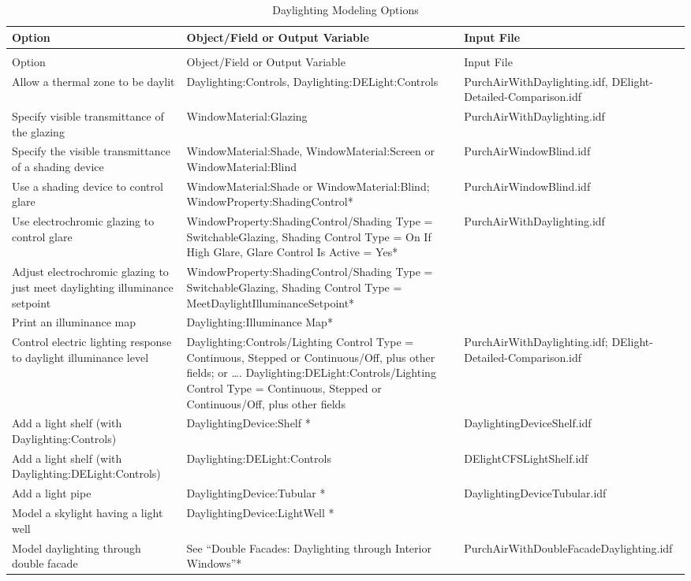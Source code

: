 {\scriptsize
\begin{longtable}[c]{>{\raggedright}p{1.5in}>{\raggedright}p{3.0in}>{\raggedright}p{1.5in}}
\caption{Daylighting Modeling Options \label{table:daylighting-modeling-options}} \tabularnewline
\toprule 
Option & Object/Field or Output Variable & Input File \tabularnewline
\midrule
\endfirsthead

\caption[]{Daylighting Modeling Options} \tabularnewline
\toprule 
Option & Object/Field or Output Variable & Input File \tabularnewline
\midrule
\endhead

Allow a thermal zone to be daylit & Daylighting:Controls, Daylighting:DELight:Controls & PurchAirWithDaylighting.idf, DElight-Detailed-Comparison.idf \tabularnewline
Specify visible transmittance of the glazing & WindowMaterial:Glazing & PurchAirWithDaylighting.idf \tabularnewline
Specify the visible transmittance of a shading device & WindowMaterial:Shade, WindowMaterial:Screen or WindowMaterial:Blind & PurchAirWindowBlind.idf \tabularnewline
Use a shading device to control glare & WindowMaterial:Shade or WindowMaterial:Blind; WindowProperty:ShadingControl* & PurchAirWindowBlind.idf \tabularnewline
Use electrochromic glazing to control glare & WindowProperty:ShadingControl/Shading Type = SwitchableGlazing, Shading Control Type = On If High Glare, Glare Control Is Active = Yes* & PurchAirWithDaylighting.idf \tabularnewline
Adjust electrochromic glazing to just meet daylighting illuminance setpoint & WindowProperty:ShadingControl/Shading Type = SwitchableGlazing, Shading Control Type = MeetDaylightIlluminanceSetpoint* & ~ \tabularnewline
Print an illuminance map & Daylighting:Illuminance Map* & ~ \tabularnewline
Control electric lighting response to daylight illuminance level & Daylighting:Controls/Lighting Control Type = Continuous, Stepped or Continuous/Off, plus other fields; or …. Daylighting:DELight:Controls/Lighting Control Type = Continuous, Stepped or Continuous/Off, plus other fields & PurchAirWithDaylighting.idf; DElight-Detailed-Comparison.idf \tabularnewline
Add a light shelf (with Daylighting:Controls) & DaylightingDevice:Shelf * & DaylightingDeviceShelf.idf \tabularnewline
Add a light shelf (with Daylighting:DELight:Controls) & Daylighting:DELight:Controls & DElightCFSLightShelf.idf \tabularnewline
Add a light pipe & DaylightingDevice:Tubular * & DaylightingDeviceTubular.idf \tabularnewline
Model a skylight having a light well & DaylightingDevice:LightWell * & ~ \tabularnewline
Model daylighting through double facade & See “Double Facades: Daylighting through Interior Windows”* & PurchAirWithDoubleFacadeDaylighting.idf \tabularnewline

\end{longtable}}
